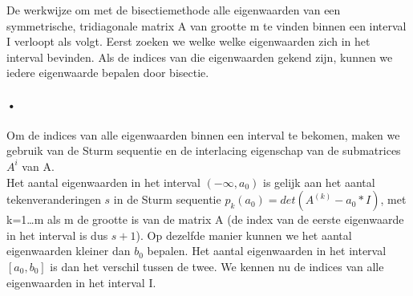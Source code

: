\documentclass[]{article}
\begin{document}
De werkwijze om met de bisectiemethode alle eigenwaarden van een symmetrische, tridiagonale matrix A van grootte m te vinden binnen een interval I verloopt als volgt. Eerst zoeken we welke welke eigenwaarden zich in het interval bevinden. Als de indices van die eigenwaarden gekend zijn, kunnen we iedere eigenwaarde bepalen door bisectie. 

\paragraph{•}
Om de indices van alle eigenwaarden binnen een interval te bekomen, maken we gebruik van de Sturm sequentie en de interlacing eigenschap van de submatrices $A^{i}$ van A. \\
Het aantal eigenwaarden in het interval $ (- \infty, a_0)$ is gelijk aan het aantal tekenveranderingen $s$ in de Sturm sequentie $ p_k (a_0) = det (A ^ {(k)} - a_0 * I) $, met k=1\dots m als m de grootte is van de matrix A (de index van de eerste eigenwaarde in het interval is dus $s+1$). Op dezelfde manier kunnen we het aantal eigenwaarden kleiner dan $ b_0 $ bepalen. Het aantal eigenwaarden in het interval $ [a_0, b_0] $ is dan het verschil tussen de twee. We kennen nu de indices van alle eigenwaarden in het interval I.
\end{document}
